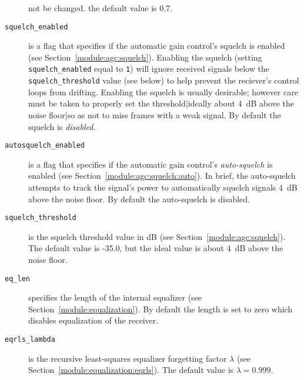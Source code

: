 \begin{description}
    not be changed.
    the default value is 0.7.
\item[{\tt squelch\_enabled}]
    is a flag that specifies if the automatic gain control's squelch is
    enabled (see Section~\ref{module:agc:squelch}).
    Enabling the squelch
    (setting {\tt squelch\_enabled} equal to {\tt 1})
    will ignore received signals below the {\tt squelch\_threshold}
    value (see below) to help prevent the reciever's control loops from
    drifting.
    Enabling the squelch is usually desirable;
    however care must be taken to properly set the threshold|ideally
    about 4~dB above the noise floor|so as not to miss frames with a
    weak signal.
    By default the squelch is {\em disabled}.
\item[{\tt autosquelch\_enabled}]
    is a flag that specifies if the automatic gain control's
    {\em auto-squelch} is enabled (see
    Section~\ref{module:agc:squelch:auto}).
    In brief, the auto-squelch attempts to track the signal's power to
    automatically squelch signals 4~dB above the noise floor.
    By default the auto-squelch is disabled.
\item[{\tt squelch\_threshold}]
    is the squelch threshold value in dB
    (see Section~\ref{module:agc:squelch}).
    The default value is -35.0, but the ideal value is about 4~dB above
    the noise floor.
\item[{\tt eq\_len}]
    specifies the length of the internal equalizer
    (see Section~\ref{module:equalization}).
    By default the length is set to zero which disables equalization of
    the receiver.
\item[{\tt eqrls\_lambda}]
    is the recursive least-squares equalizer forgetting factor
    $\lambda$
    (see Section~\ref{module:equalization:eqrls}).
    The default value is $\lambda=0.999$.
\end{description}


